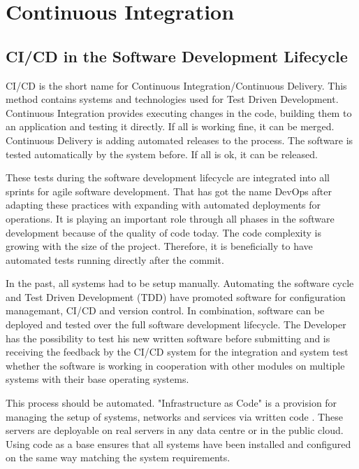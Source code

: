 \chapter{Continuous Integration}\label{ch:ci_cd}

\section{CI/CD in the Software Development Lifecycle}

CI/CD is the short name for Continuous Integration/Continuous Delivery. This method contains systems and technologies used for Test Driven Development. Continuous Integration provides executing changes in the code, building them to an application and testing it directly. 
If all is working fine, it can be merged. Continuous Delivery is adding automated releases to the process. 
The software is tested automatically by the system before. If all is ok, it can be released.

These tests during the software development lifecycle are integrated into all sprints for agile software development. That has got the name DevOps after adapting these practices with expanding with automated deployments for operations. It is playing an important role through all phases in the software development because of the quality of code today. The code complexity is growing with the size of the project. Therefore, it is beneficially to have automated tests running directly after the commit. 

In the past, all systems had to be setup manually. Automating the software cycle and Test Driven Development (TDD) have promoted software for configuration managemant, CI/CD and version control. In combination, software can be deployed and tested over the full software development lifecycle. The Developer has the possibility to test his new written software before submitting and is receiving the feedback by the CI/CD system for the integration and system test whether the software is working in cooperation with other modules on multiple systems with their base operating systems.

This process should be automated. "Infrastructure as Code" is a provision for managing the setup of systems, networks and services via written code \cite[~p.110]{Scholl2019}. These servers are deployable on real servers in any data centre or in the public cloud. Using code as a base ensures that all systems have been installed and configured on the same way matching the system requirements. 

